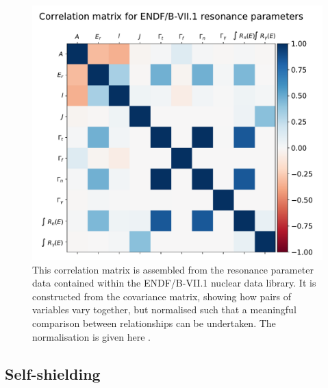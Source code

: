 \begin{figure}[H]
  \centering
  \includegraphics[width=\linewidth]{res_correlation}
  \caption{This correlation matrix is assembled from the resonance parameter data contained within the ENDF/B-VII.1 nuclear data library. It is constructed from the covariance matrix, showing how pairs of variables vary together, but normalised such that a meaningful comparison between relationships can be undertaken. The normalisation is given here \cite{numpy2018}.}
  \label{fig:res_correlation}
\end{figure}



\subsection{Self-shielding}


